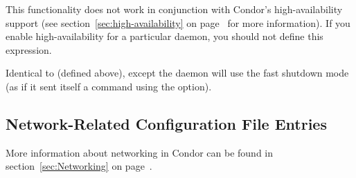 \begin{description}
  \Note This functionality does not work in conjunction with Condor's
  high-availability support (see section~\ref{sec:high-availability}
  on page~\pageref{sec:high-availability} for more information).
  If you enable high-availability for a particular daemon, you should
  not define this expression.

\item[\Macro{DAEMON\_SHUTDOWN\_FAST}] \label{param:DaemonShutdownFast}
  Identical to  (defined above), except the
  daemon will use the fast shutdown mode (as if it sent itself a
   command using the  option).

\end{description}

\subsection{\label{sec:Network-Related-Config-File-Entries}Network-Related Configuration File Entries}

More information about networking in Condor can be found in
section~\ref{sec:Networking} on page~\pageref{sec:Networking}.

